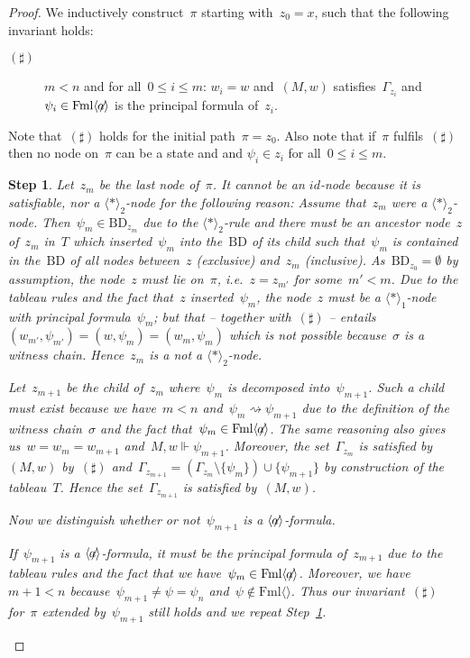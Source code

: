 \documentclass{entcs}
\newtheorem{stp}{Step}
\newenvironment{step}{\vspace{-\lastskip}\par \addvspace{.6pc
    plus .2pc minus .1pc}\begin{stp}\rm}{\end{stp}\par\addvspace{.6pc
    plus .2pc minus .1pc}}
\newcommand{\ie}{\emph{i.e.}}
\newcommand{\pea}[2]{\langle#1\rangle #2}
\newcommand{\prp}[1]{#1*}
\newcommand{\fean}{$\pea{\not\!\!a}{}$}
\newcommand{\fmlea}{\mathrm{Fml}\pea{}{}}
\newcommand{\fmlean}{\mathrm{Fml}\pea{\not\!\!a}{}}
\newcommand{\psr}[2]{#1 \Vdash #2}
\newcommand{\pzz}{\mathrel{\rightsquigarrow}}
\newcommand{\tbdia}{\mathrm{BD}}
\newcommand{\trid}{$id$}
\newcommand{\trero}{$\pea{\prp{}}{}_1$}
\newcommand{\trert}{$\pea{\prp{}}{}_2$}
\newcommand{\fchn}{\sigma}
\begin{document}
\begin{proof}
  We inductively construct~$\pi$ starting with~$z_0 = x$,
  such that the following invariant holds:
  \begin{description}
  \item[$(\sharp)$] $m < n$ and for all~$0 \leq i \leq m$:
    $w_i = w$ and~$(M, w)$ satisfies~$\Gamma_{z_i}$ and~$\psi_i \in \fmlean$ is the principal formula of~$z_i$.
  \end{description}
  Note that~$(\sharp)$ holds for the initial path~$\pi = z_0$.
  Also note that if~$\pi$ fulfils~$(\sharp)$
  then no node on~$\pi$ can be a state and
  and $\psi_i \in z_i$ for all~$0 \leq i \leq m$.
  \begin{step}
    \label{step_two}
    Let~$z_m$ be the last node of~$\pi$.
    It cannot be an \trid{}-node because it is satisfiable,
    nor a \trert{}-node for the following reason:
    Assume that~$z_m$ were a \trert{}-node.
    Then~$\psi_m \in \tbdia_{z_m}$ due to the \trert{}-rule
    and there must be an ancestor node~$z$ of~$z_m$ in~$T$
    which inserted~$\psi_m$ into the~$\tbdia$ of its child
    such that~$\psi_m$ is contained in the~$\tbdia$ of all nodes
    between~$z$ (exclusive) and~$z_m$ (inclusive).
    As~$\tbdia_{z_0} = \emptyset$ by assumption,
    the node~$z$ must lie on~$\pi$,
    \ie{}~$z = z_{m'}$ for some~$m' < m$.
    Due to the tableau rules and the fact that~$z$ inserted~$\psi_m$, 
    the node~$z$ must be a \trero{}-node with principal formula~$\psi_m$;
    but that -- together with~$(\sharp)$ --
    entails~$(w_{m'},\psi_{m'}) = (w, \psi_m) = (w_m, \psi_m)$
    which is not possible because~$\fchn$ is a witness chain.
    Hence~$z_m$ is a not a \trert{}-node.

    Let~$z_{m+1}$ be the child of~$z_m$
    where~$\psi_m$ is decomposed into~$\psi_{m+1}$.
    Such a child must exist because we have~$m < n$ and~$\psi_m \pzz \psi_{m+1}$
    due to the definition of the witness chain~$\fchn$ and the fact that~$\psi_m \in \fmlean$.
    The same reasoning also gives us~$w = w_m = w_{m+1}$ and~$\psr{M,w}{\psi_{m+1}}$.
    Moreover, the set~$\Gamma_{z_m}$ is satisfied by~$(M,w)$ by~$(\sharp)$
    and~$\Gamma_{z_{m+1}} = (\Gamma_{z_m} \setminus \{ \psi_m \}) \cup \{ \psi_{m+1} \}$ by construction of the tableau~$T$.
    Hence the set~$\Gamma_{z_{m+1}}$ is satisfied by~$(M,w)$.

    Now we distinguish whether or not~$\psi_{m+1}$ is a \fean{}-formula.

    If~$\psi_{m+1}$ is a \fean{}-formula,
    it must be the principal formula of~$z_{m+1}$
    due to the tableau rules and the fact that we have~$\psi_m \in \fmlean$.
    Moreover, we have~$m+1 < n$ because~$\psi_{m+1} \not= \psi = \psi_n$ and~$\psi \notin \fmlea$.
    Thus our invariant~$(\sharp)$ for~$\pi$ extended by~$\psi_{m+1}$ still holds
    and we repeat Step~\ref{step_two}.


\end{step}
\end{proof}
\end{document}
